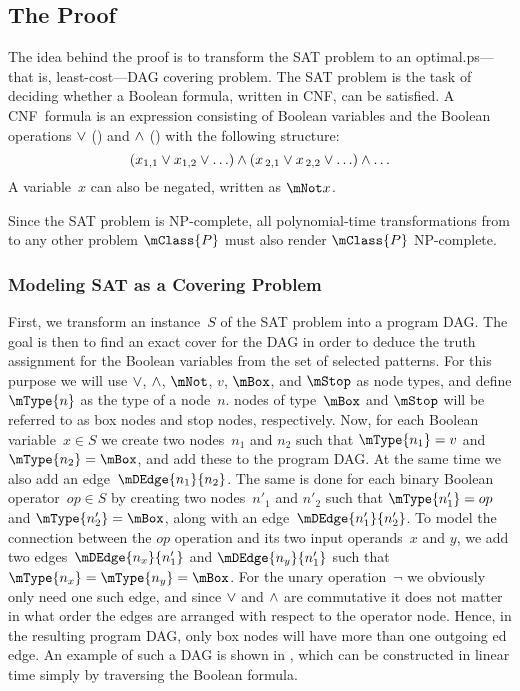 \subsection{The Proof}

The idea behind the proof is to transform the \gls{SAT problem} to an
\gls{optimal.ps}---that is, least-cost---\gls{DAG covering} problem.
%
The
\gls{SAT problem} is the task of deciding whether a Boolean formula, written in
\gls{CNF}, can be satisfied.
%
A \gls{CNF}~formula is an expression consisting of
Boolean variables and the Boolean operations $\vee$ (\tOr) and $\wedge$ (\tAnd)
with the following structure:
\begin{displaymath}
  (x_{1,1} \vee x_{1,2} \vee \ldots) \wedge (x_{\,2,1} \vee x_{\,2,2} \vee \ldots) \wedge
  \ldots
\end{displaymath}
A variable~$x$ can also be negated, written as \mbox{$\mNot x$}.

Since the \gls{SAT problem} is NP-complete, all polynomial-time
transformations from  to any other problem $\mClass{P}$
must also render $\mClass{P}$ NP-complete.


\subsubsection{Modeling SAT as a Covering Problem}

First, we transform an instance~$S$ of the \gls{SAT problem} into a \gls{program
  DAG}.
%
The goal is then to find an exact cover for the \gls{DAG} in order to
deduce the truth assignment for the Boolean variables from the set of selected
\glspl{pattern}.
%
For this purpose we will use $\vee$, $\wedge$, $\mNot$, $v$,
$\mBox$, and $\mStop$ as \gls{node} types, and define $\mType{n}$ as the type of
a \gls{node}~$n$.
%
\Glspl{node} of type~$\mBox$ and $\mStop$ will be referred to
as \glspl{box node} and \glspl{stop node}, respectively.
%
Now, for each Boolean
variable~\mbox{$x \in S$} we create two \glspl{node}~$n_1$ and $n_2$ such that
\mbox{$\mType{n_1} = v$} and \mbox{$\mType{n_2} = \mBox$}, and add these to the
\gls{program DAG}.
%
At the same time we also add an
\gls{edge}~$\mDEdge{n_1}{n_2}$.
%
The same is done for each binary Boolean
operator~\mbox{$\mathit{op} \in S$} by creating two \glspl{node}~$n'_1$ and
$n'_2$ such that \mbox{$\mType{n'_1} = op$} and \mbox{$\mType{n'_2} = \mBox$},
along with an \gls{edge}~$\mDEdge{n'_1}{n'_2}$.
%
To model the connection between
the $\mathit{op}$ operation and its two input operands~$x$ and $y$, we add two
\glspl{edge}~$\mDEdge{n_x}{n'_1}$ and $\mDEdge{n_y}{n'_1}$ such that
\mbox{$\mType{n_x} = \mType{n_y} = \mBox$}.
%
For the unary operation~$\neg$ we
obviously only need one such \gls{edge}, and since $\vee$ and $\wedge$ are
commutative it does not matter in what order the \glspl{edge} are arranged with
respect to the operator \gls{node}.
%
Hence, in the resulting \gls{program DAG},
only \glspl{box node} will have more than one \gls{outgoing ed} \gls{edge}.
%
An
example of such a \gls{DAG} is shown in , which can
be constructed in linear time simply by traversing the Boolean formula.


